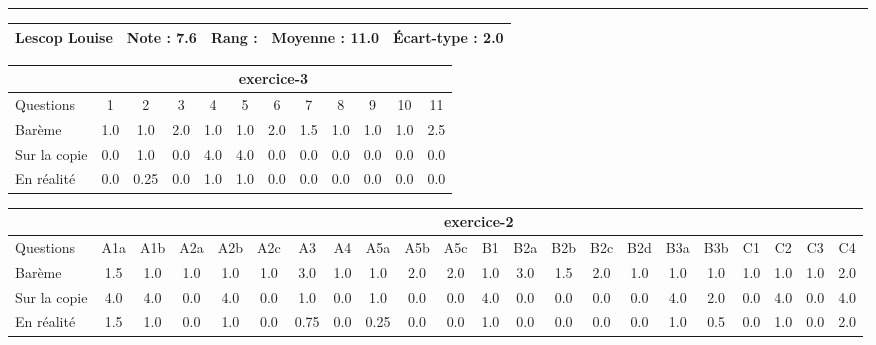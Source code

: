 \documentclass[a4paper, landscape, 10pt]{article}
\begin{document}
  \vspace{0.3cm}
  \hrule
  \vspace{0.3cm}

  \begin{minipage}{\textwidth}
    { \bf
    \begin{tabular}{|c|*{4}{c|}}
    \hline
      Lescop Louise & Note : 7.6 & Rang :  & Moyenne : 11.0 & \'Ecart-type : 2.0 \\
    \hline
    \end{tabular}
    }
    
      \begin{tabular}{|l|*{ 11 }{c|}}
        \hline
        & \multicolumn{ 11 }{c|}{ exercice-3 } \\
        \hline
        Questions & 1&2&3&4&5&6&7&8&9&10&11 \\
        \hline
        Barème & 1.0&1.0&2.0&1.0&1.0&2.0&1.5&1.0&1.0&1.0&2.5 \\
        \hline
        Sur la copie & 0.0&1.0&0.0&4.0&4.0&0.0&0.0&0.0&0.0&0.0&0.0 \\
        \hline
        En réalité & 0.0&0.25&0.0&1.0&1.0&0.0&0.0&0.0&0.0&0.0&0.0 \\
        \hline
      \end{tabular}
    
      \begin{tabular}{|l|*{ 21 }{c|}}
        \hline
        & \multicolumn{ 21 }{c|}{ exercice-2 } \\
        \hline
        Questions & A1a&A1b&A2a&A2b&A2c&A3&A4&A5a&A5b&A5c&B1&B2a&B2b&B2c&B2d&B3a&B3b&C1&C2&C3&C4 \\
        \hline
        Barème & 1.5&1.0&1.0&1.0&1.0&3.0&1.0&1.0&2.0&2.0&1.0&3.0&1.5&2.0&1.0&1.0&1.0&1.0&1.0&1.0&2.0 \\
        \hline
        Sur la copie & 4.0&4.0&0.0&4.0&0.0&1.0&0.0&1.0&0.0&0.0&4.0&0.0&0.0&0.0&0.0&4.0&2.0&0.0&4.0&0.0&4.0 \\
        \hline
        En réalité & 1.5&1.0&0.0&1.0&0.0&0.75&0.0&0.25&0.0&0.0&1.0&0.0&0.0&0.0&0.0&1.0&0.5&0.0&1.0&0.0&2.0 \\
        \hline
      \end{tabular}
    

\end{minipage}
\end{document}

